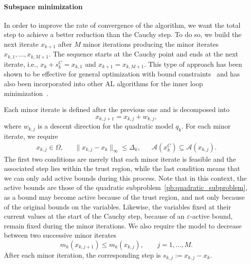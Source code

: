 \documentclass{article}
\numberwithin{equation}{section}
\newcommand{\calA}{{\mathcal{A}}}
\theoremstyle{plain}
\begin{document}
\paragraph*{Subspace minimization} In order to improve the rate of convergence of the algorithm, we want the total step to achieve a better reduction than the Cauchy step. To do so, we build the next iterate $x_{k+1}$ after $M$ minor iterations producing the minor iterates $x_{k,1},\ldots,x_{k,M+1}$. The sequence starts at the Cauchy point and ends at the next iterate, i.e., $x_{k}+s_k^C=x_{k,1}$ and $x_{k+1}=x_{k,M+1}$. This type of approach has been shown to be effective for general optimization with bound constraints~\cite{linmore:1999a} and has also been incorporated into other AL algorithms for the inner loop minimization~\cite{conn-etal:1992,arreckx-etal:2016}.

Each minor iterate is defined after the previous one and is decomposed into 
\[x_{k,j+1}=x_{k,j}+w_{k,j},\]
where $w_{k,j}$ is a descent direction for the quadratic model $q_k$. For each minor iterate, we require
\begin{equation}\label{eq:minor_iterate_feasible}
	\begin{aligned}
		x_{k,j} \in \Omega, & & \|x_{k,j} - x_k \|_\infty \le \Delta_k, & & \calA(x_k^C) \subseteq \calA(x_{k,j}).
	\end{aligned}
\end{equation}
The first two conditions are merely that each minor iterate is feasible and the associated step lies within the trust region, while the last condition means that we can only add active bounds during this process. Note that in this context, the active bounds are those of the quadratic subproblem~\eqref{pb:quadratic_subproblem}, as a bound may become active because of the trust region, and not only because of the original bounds on the variables. Likewise, the variables fixed at their current values at the start of the Cauchy step, because of an $\varepsilon$-active bound, remain fixed during the minor iterations.
We also require the model to decrease between two successive minor iterates
\begin{equation}\label{eq:minor_iterate_decrease}
	m_k(x_{k,j+1}) \le m_k(x_{k,j}), \qquad j = 1,\ldots,M.
\end{equation}
After each minor iteration, the corresponding step is $s_{k,j}:=x_{k,j}-x_k$.
\end{document}
